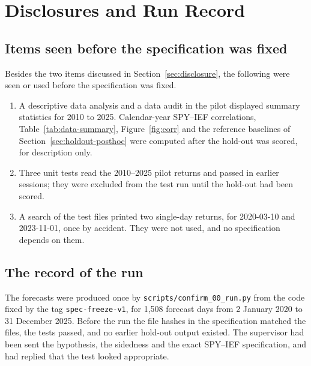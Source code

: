 \section{Disclosures and Run Record}\label{app:disclosure}

\subsection{Items seen before the specification was fixed}

Besides the two items discussed in Section~\ref{sec:disclosure}, the following were seen or used before the specification was fixed.
\begin{enumerate}
\item A descriptive data analysis and a data audit in the pilot displayed summary statistics for 2010 to 2025. Calendar-year SPY--IEF correlations, Table~\ref{tab:data-summary}, Figure~\ref{fig:corr} and the reference baselines of Section~\ref{sec:holdout-posthoc} were computed after the hold-out was scored, for description only.
\item Three unit tests read the 2010--2025 pilot returns and passed in earlier sessions; they were excluded from the test run until the hold-out had been scored.
\item A search of the test files printed two single-day returns, for 2020-03-10 and 2023-11-01, once by accident. They were not used, and no specification depends on them.
\end{enumerate}

\subsection{The record of the run}\label{sec:holdout-record}

The forecasts were produced once by \texttt{scripts/confirm\_00\_run.py} from the code fixed by the tag \texttt{spec-freeze-v1}, for 1,508 forecast days from 2 January 2020 to 31 December 2025. Before the run the file hashes in the specification matched the files, the tests passed, and no earlier hold-out output existed. The supervisor had been sent the hypothesis, the sidedness and the exact SPY--IEF specification, and had replied that the test looked appropriate.

